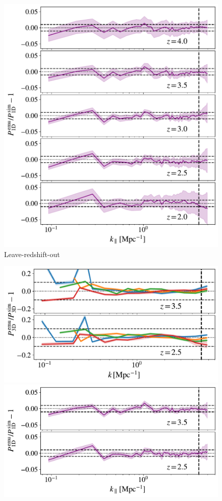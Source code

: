 \documentclass[longauth]{aa}
\begin{document}
\begin{figure}
\includegraphics[width= 0.98\columnwidth]{figures/l1O_P1D.pdf}
\Large{Leave-redshift-out}\par\medskip
\includegraphics[width= 0.95\columnwidth]{figures/l1O_z_P3D.pdf}
\includegraphics[width= 0.96\columnwidth]{figures/l1O_z_P1D.pdf}

\end{figure}
\end{document}
